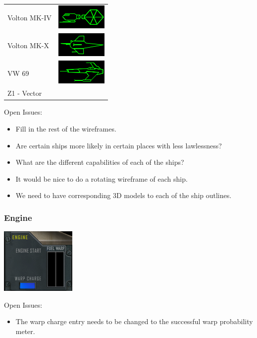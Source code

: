 \begin{itemize}
\begin{tabular}{ | l | l | }
Volton MK-IV & \includegraphics[scale=0.75]{images/ship_Voton_MK_IV.png} \\
Volton MK-X & \includegraphics[scale=0.75]{images/ship_Voton_MK_X.png} \\
VW 69 & \includegraphics[scale=0.75]{images/ship_VW-69.png} \\
Z1 - Vector & \\
\hline
\end{tabular}

Open Issues:
\begin{itemize}
\item Fill in the rest of the wireframes.
\item Are certain ships more likely in certain places with less lawlessness?
\item What are the different capabilities of each of the ships?
\item It would be nice to do a rotating wireframe of each ship.
\item We need to have corresponding 3D models to each of the ship outlines.
\end{itemize}

\subsubsection{Engine}
\includegraphics[scale=0.70]{images/engine.png}

Open Issues:
\begin{itemize}
\item The warp charge entry needs to be changed to the successful warp
probability meter.
\end{itemize}


\end{itemize}

